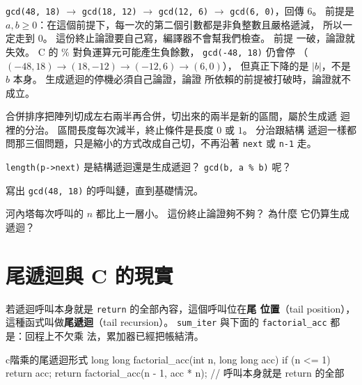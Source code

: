 
\texttt{gcd(48, 18)} $\rightarrow$ \texttt{gcd(18, 12)} $\rightarrow$
\texttt{gcd(12, 6)} $\rightarrow$ \texttt{gcd(6, 0)}，回傳 $6$。 前提是
$a, b \ge 0$：在這個前提下，每一次的第二個引數都是非負整數且嚴格遞減，
所以一定走到 $0$。 這份終止論證要自己寫，編譯器不會幫我們檢查。 前提
一破，論證就失效。 C 的 $\%$ 對負運算元可能產生負餘數，
\texttt{gcd(-48, 18)} 仍會停
（$(-48, 18) \rightarrow (18, -12) \rightarrow (-12, 6) \rightarrow (6, 0)$），
但真正下降的是 $|b|$，不是 $b$ 本身。 生成遞迴的停機必須自己論證，論證
所依賴的前提被打破時，論證就不成立。

合併排序把陣列切成左右兩半再合併，切出來的兩半是新的區間，屬於生成遞
迴裡的分治。 區間長度每次減半，終止條件是長度 $0$ 或 $1$。 分治跟結構
遞迴一樣都問那三個問題，只是縮小的方式改成自己切，不再沿著 \texttt{next}
或 \texttt{n-1} 走。


\begin{drills}[label=drills:rec-struct-vs-gen]
\item \texttt{length(p->next)} 是結構遞迴還是生成遞迴？ \texttt{gcd(b, a \% b)}
呢？
\item 寫出 \texttt{gcd(48, 18)} 的呼叫鏈，直到基礎情況。
\item 河內塔每次呼叫的 $n$ 都比上一層小。 這份終止論證夠不夠？ 為什麼
它仍算生成遞迴？
\end{drills}

\section{尾遞迴與 C 的現實}
\label{sec:rec-tail}

若遞迴呼叫本身就是 \texttt{return} 的全部內容，這個呼叫位在\textbf{尾
位置}（tail position），這種函式叫做\textbf{尾遞迴}（tail recursion）。
\texttt{sum\_iter} 與下面的 \texttt{factorial\_acc} 都是：回程上不欠乘
法，累加器已經把帳結清。

\begin{code}{c}{階乘的尾遞迴形式}
long long factorial_acc(int n, long long acc) {
    if (n <= 1) {
        return acc;
    }
    return factorial_acc(n - 1, acc * n);  // 呼叫本身就是 return 的全部
}
\end{code}

